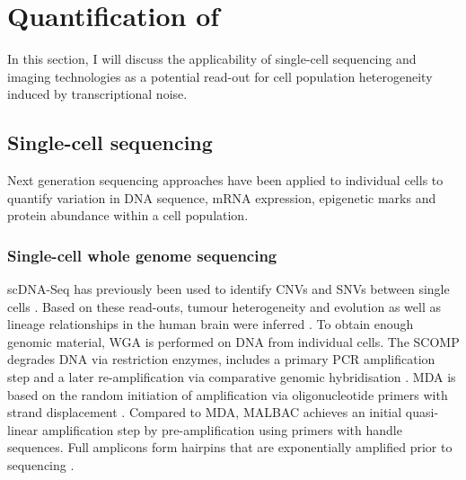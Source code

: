 
\section{Quantification of }

In this section, I will discuss the applicability of single-cell sequencing and imaging technologies as a potential read-out for cell population heterogeneity induced by transcriptional noise.

\subsection{Single-cell sequencing}

Next generation sequencing approaches have been applied to individual cells to quantify variation in DNA sequence, mRNA expression, epigenetic marks and protein abundance within a cell population. 

\subsubsection{Single-cell whole genome sequencing}

\Gls{scDNA-Seq} has previously been used to identify CNVs and SNVs between single cells \citep{Zong2012}. 
Based on these read-outs, tumour heterogeneity and evolution \citep{Navin2011} as well as lineage relationships in the human brain were inferred \citep{Evrony2015}. 
To obtain enough genomic material, \gls{WGA} is performed on DNA from individual cells. The \gls{SCOMP} degrades DNA via restriction enzymes, includes a primary \gls{PCR} amplification step and a later re-amplification via comparative genomic hybridisation \citep{Klein1999}. \Gls{MDA} is based on the random initiation of amplification via oligonucleotide primers with strand displacement \citep{Dean2002}. Compared to MDA, \gls{MALBAC} achieves an initial quasi-linear amplification step by pre-amplification using primers with handle sequences. 
Full amplicons form hairpins that are exponentially amplified prior to sequencing \citep{Zong2012}. \\

